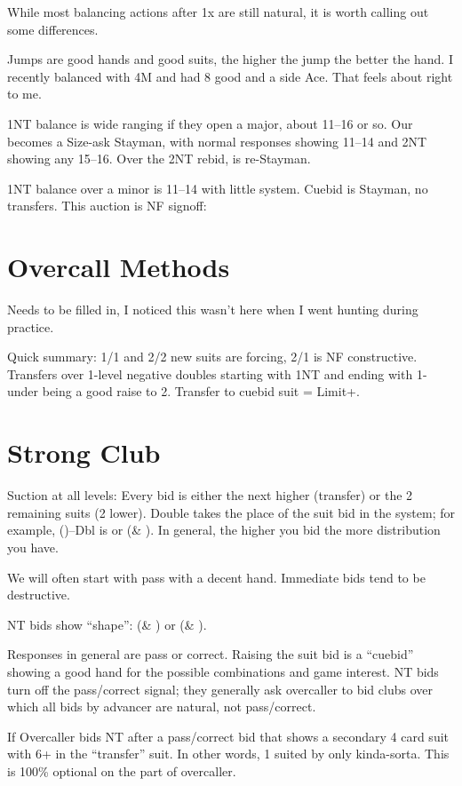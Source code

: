 \documentclass[main]{subfile}
\begin{document}
	While most balancing actions after 1x are still natural, it is worth calling out some differences.
	
	Jumps are good hands and good suits, the higher the jump the better the hand. I recently balanced with 4M and had 8 good and a side Ace. That feels about right to me.
	
	1NT balance is wide ranging if they open a major, about 11--16 or so. Our  becomes a Size-ask Stayman, with normal responses showing 11--14 and 2NT showing any 15--16. Over the 2NT rebid,  is re-Stayman.
	
	1NT balance over a minor is 11--14 with little system. Cuebid is Stayman, no transfers. This auction is NF signoff:
	
	
	\section{Overcall Methods}
	
		Needs to be filled in, I noticed this wasn't here when I went hunting during practice.
		
		Quick summary:  1/1 and 2/2 new suits are forcing, 2/1 is NF constructive.  Transfers over 1-level negative doubles starting with 1NT and ending with 1-under being a good raise to 2.  Transfer to cuebid suit = Limit+.
	
	\section{Strong Club}
	
	Suction at all levels: Every bid is either the next higher (transfer) or the 2 remaining suits (2 lower). Double takes the place of the suit bid in the system; for example, ()--Dbl is \ddd or (\hhh \& \sss). In general, the higher you bid the more distribution you have. 
	
	We will often start with pass with a decent hand. Immediate bids tend to be destructive.
	
	NT bids show ``shape'': (\ddd \& \sss) or (\ccc \& \hhh).
	
	Responses in general are pass or correct. Raising the suit bid is a ``cuebid'' showing a good hand for the possible combinations and game interest. NT bids turn off the pass/correct signal; they generally ask overcaller to bid clubs over which all bids by advancer are natural, not pass/correct.
	
	If Overcaller bids NT after a pass/correct bid that shows a secondary 4 card suit with 6+ in the ``transfer'' suit. In other words, 1 suited by only kinda-sorta. This is 100\% optional on the part of overcaller.
	
\end{document}
